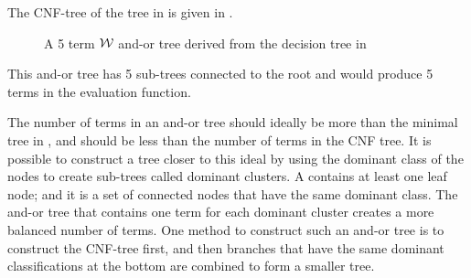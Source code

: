 The CNF-tree of the tree in  is given in . 
\begin{figure}
\center
\tiny
{}
{
}
\caption{A 5 term ${\mathcal W}$ and-or tree derived from the decision tree in }
\label{fig:wintree_maximal}
\end{figure}
 This and-or tree has 5 sub-trees connected to the root and would produce 5 terms in the evaluation function. 
 
The number of terms in an and-or tree should ideally be more than the minimal tree in , and should be less than the number of terms in the CNF tree.  It is possible to construct a tree closer to this ideal by using the dominant class of the nodes to create sub-trees called dominant clusters.  A  contains at least one leaf node; and it is a set of connected nodes that have the same dominant class. The and-or tree that contains one term for each dominant cluster creates a more balanced number of terms. One method to construct such an and-or tree is to construct the CNF-tree first, and then branches that have the same dominant classifications at the bottom are combined to form a smaller tree.

